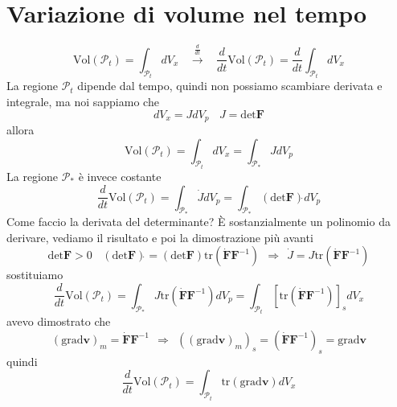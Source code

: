 \documentclass[10pt,a4paper,twoside]{book}
\begin{document}
\section{Variazione di volume nel tempo}
\begin{equation*}
\mathrm{Vol}(\mathcal{P}_{t}) =\int _{\mathcal{P}_{t}} dV_{x} \ \ \ \ \xrightarrow{\frac{d}{dt}} \ \ \ \ \frac{d}{dt}\mathrm{Vol}(\mathcal{P}_{t}) =\frac{d}{dt}\int _{\mathcal{P}_{t}} dV_{x}
\end{equation*}
La regione $\mathcal{P}_{t}$ dipende dal tempo, quindi non possiamo scambiare derivata e integrale, ma noi sappiamo che
\begin{equation*}
dV_{x} =JdV_{p} \ \ \ \ J=\mathrm{det}\mathbf{F}
\end{equation*}
allora
\begin{equation*}
\mathrm{Vol}(\mathcal{P}_{t}) =\int _{\mathcal{P}_{t}} dV_{x} =\int _{\mathcal{P}_{*}} JdV_{p}
\end{equation*}
La regione $\mathcal{P}_{*}$ è invece costante
\begin{equation*}
\frac{d}{dt}\mathrm{Vol}(\mathcal{P}_{t}) =\int _{\mathcal{P}_{*}}\dot{J} dV_{p} =\int _{\mathcal{P}_{*}}(\mathrm{det}\mathbf{F})\dot{} dV_{p}
\end{equation*}
Come faccio la derivata del determinante? È sostanzialmente un polinomio da derivare, vediamo il risultato e poi la dimostrazione più avanti
\begin{equation*}
\mathrm{det}\mathbf{F}  >0\ \ \ \ (\mathrm{det}\mathbf{F})\dot{} =(\mathrm{det}\mathbf{F})\mathrm{tr}\left(\dot{\mathbf{F}}\mathbf{F}^{-1}\right) \ \ \Rightarrow \ \ \dot{J} =J\mathrm{tr}\left(\dot{\mathbf{F}}\mathbf{F}^{-1}\right)
\end{equation*}
sostituiamo
\begin{equation*}
\frac{d}{dt}\mathrm{Vol}(\mathcal{P}_{t}) =\int _{\mathcal{P}_{*}} J\mathrm{tr}\left(\dot{\mathbf{F}}\mathbf{F}^{-1}\right) dV_{p} =\int _{\mathcal{P}_{t}}\left[\mathrm{tr}\left(\dot{\mathbf{F}}\mathbf{F}^{-1}\right)\right]_{s} dV_{x}
\end{equation*}
avevo dimostrato che
\begin{equation*}
(\mathrm{grad}\mathbf{v})_{m} =\dot{\mathbf{F}}\mathbf{F}^{-1} \ \ \Rightarrow \ \ ((\mathrm{grad}\mathbf{v})_{m})_{s} =\left(\dot{\mathbf{F}}\mathbf{F}^{-1}\right)_{s} =\mathrm{grad}\mathbf{v}
\end{equation*}
quindi
\begin{equation*}
\frac{d}{dt}\mathrm{Vol}(\mathcal{P}_{t}) =\int _{\mathcal{P}_{t}}\mathrm{tr}(\mathrm{grad}\mathbf{v}) dV_{x}
\end{equation*}
\end{document}
